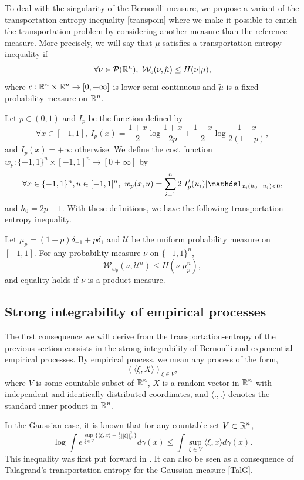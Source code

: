 \documentclass[a4paper,oneside,11pt]{article}
\begin{document}
To deal with the singularity of the Bernoulli measure, we propose a variant of the transportation-entropy inequality \eqref{transpoin} where we make it possible to enrich the transportation problem by considering another measure than the reference measure. More precisely, we will say that $\mu$ satisfies a transportation-entropy inequality if 
$$  \forall \nu \in \mathcal{P}(\mathbb{R}^n), \   \mathcal{W}_c(\nu,\tilde \mu) \leq H(\nu|\mu),$$
where $c : \mathbb{R}^n \times \mathbb{R}^n \to [0,+\infty]$ is lower semi-continuous and $\tilde \mu$ is a fixed probability measure on $\mathbb{R}^n$.
  

Let $p\in(0,1)$ and $I_p$ be the function defined by
\begin{equation} \label{defIp}\forall x \in[-1,1], \ I_p(x) =  \frac{1+x}{2} \log \frac{1+x}{2p} + \frac{1-x}{2} \log \frac{1-x}{2(1-p)},\end{equation}
and $I_p(x) = +\infty$ otherwise.
We define the cost function $w_p : \{-1,1\}^n \times [-1,1]^n\to [0+\infty]$ by 
\begin{equation} \label{defw} \forall  x \in \{-1,1\}^n, u \in [-1,1]^n, \ w_p(x,u) = \sum_{i=1}^n 2 |I'_p(u_i)| \Car_{x_i (h_0- u_i) <0},\end{equation}
and $h_0 = 2p-1$. 
With these definitions, we have the following transportation-entropy inequality.
\begin{Pro}\label{transpo} Let $\mu_p= (1-p) \delta_{-1} + p \delta_{1}$ and $\mathcal{U}$ be the uniform probability measure on $[-1,1]$.
For any probability measure $\nu$ on $\{-1,1\}^n$,
$$ \mathcal{W}_{w_p}( \nu,\mathcal{U}^n) \leq H(\nu | \mu_p^n),$$
and equality holds if $\nu$ is a product measure.
\end{Pro}
\subsection{Strong integrability of empirical processes}
The first consequence we will derive from the transportation-entropy of the previous section consists in the strong integrability of Bernoulli and exponential empirical processes. By empirical process, we mean any process of the form,
$$ (\langle \xi, X \rangle)_{\xi \in V},$$
where $V$ is some countable subset of $\mathbb{R}^n$, $X$ is a random vector in $\mathbb{R}^n$ with independent and identically distributed coordinates, and $\langle . , . \rangle$ denotes the standard inner product in $\mathbb{R}^n$.

In the Gaussian case, it is known that for any countable set $V \subset \mathbb{R}^n$,
\begin{equation} \label{strongG} \log \int e^{\sup_{\xi \in V} \{ \langle \xi, x \rangle - \frac{1}{2} ||\xi||_{\ell^2}^2\} } d \gamma(x) \leq \int \sup_{\xi \in V} \langle \xi, x \rangle d\gamma(x).\end{equation}
This inequality was first put forward in \cite{Vitale}. It can also be seen as a consequence of Talagrand's transportation-entropy for the Gaussian measure \eqref{TalG}. 
\end{document}

